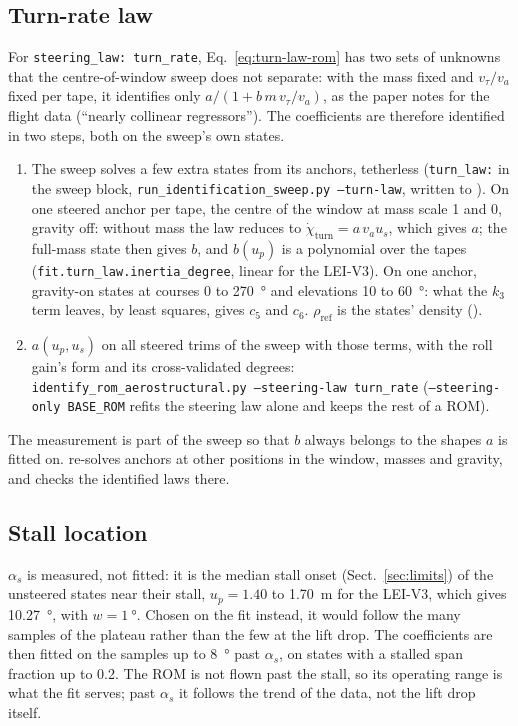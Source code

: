\documentclass[11pt,a4paper]{article}
\newcommand{\code}[1]{\texttt{\small #1}}
\begin{document}
\subsection{Turn-rate law}
\label{sec:turn-law-fit}
For \code{steering\_law: turn\_rate}, Eq.~\eqref{eq:turn-law-rom} has two sets of
unknowns that the centre-of-window sweep does not separate: with the mass fixed and
$v_\tau/v_a$ fixed per tape, it identifies only $a/(1+b\,m\,v_\tau/v_a)$, as the paper
notes for the flight data (``nearly collinear regressors''). The coefficients are
therefore identified in two steps, both on the sweep's own states.
\begin{enumerate}
  \item The sweep solves a few extra states from its anchors, tetherless
        (\code{turn\_law:} in the sweep block,
        \code{run\_identification\_sweep.py --turn-law}, written to
        ). On one steered anchor per tape, the centre of the
        window at mass scale 1 and 0, gravity off: without mass the law reduces to
        $\dot\chi_\mathrm{turn}=a\,v_a u_s$, which gives $a$; the full-mass state then
        gives $b$, and $b(u_p)$ is a polynomial over the tapes
        (\code{fit.turn\_law.inertia\_degree}, linear for the LEI-V3). On one anchor,
        gravity-on states at courses 0 to \SI{270}{\degree} and elevations 10 to
        \SI{60}{\degree}: what the $k_3$ term leaves, by least squares, gives $c_5$ and
        $c_6$. $\rho_\mathrm{ref}$ is the states' density
        ().
  \item $a(u_p,u_s)$ on all steered trims of the sweep with those terms, with the roll
        gain's form and its cross-validated degrees:
        \code{identify\_rom\_aerostructural.py --steering-law turn\_rate}
        (\code{--steering-only BASE\_ROM} refits the steering law alone and keeps the
        rest of a ROM).
\end{enumerate}
The measurement is part of the sweep so that $b$ always belongs to the shapes $a$ is
fitted on.  re-solves anchors at other positions in the
window, masses and gravity, and checks the identified laws there.

\subsection{Stall location}
$\alpha_s$ is measured, not fitted: it is the median stall onset
(Sect.~\ref{sec:limits}) of the unsteered states near their stall, $u_p=1.40$ to
\SI{1.70}{\metre} for the LEI-V3, which gives \SI{10.27}{\degree}, with
$w=\SI{1}{\degree}$. Chosen on the fit instead, it would follow the many samples of the
plateau rather than the few at the lift drop. The coefficients are then fitted on
the samples up to \SI{8}{\degree} past $\alpha_s$, on states with a stalled span
fraction up to \num{0.2}. The ROM is not flown past the stall, so its operating range
is what the fit serves; past $\alpha_s$ it follows the trend of the data, not the lift
drop itself.
\end{document}
